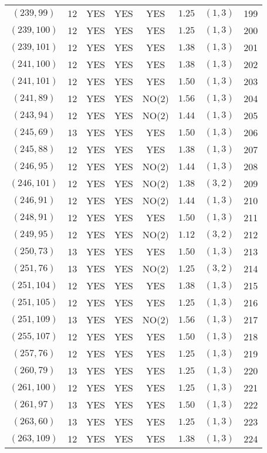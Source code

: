 \begin{longtable}{|c|c|c|c|c|c|c|c|}
$(239,99)$ & 12 & YES & YES & YES & $1.25$ & $(1,3)$ & 199\\
$(239,100)$ & 12 & YES & YES & YES & $1.25$ & $(1,3)$ & 200\\
$(239,101)$ & 12 & YES & YES & YES & $1.38$ & $(1,3)$ & 201\\
$(241,100)$ & 12 & YES & YES & YES & $1.38$ & $(1,3)$ & 202\\
$(241,101)$ & 12 & YES & YES & YES & $1.50$ & $(1,3)$ & 203\\
$(241,89)$ & 12 & YES & YES & NO(2) & $1.56$ & $(1,3)$ & 204\\
$(243,94)$ & 12 & YES & YES & NO(2) & $1.44$ & $(1,3)$ & 205\\
$(245,69)$ & 13 & YES & YES & YES & $1.50$ & $(1,3)$ & 206\\
$(245,88)$ & 12 & YES & YES & YES & $1.38$ & $(1,3)$ & 207\\
$(246,95)$ & 12 & YES & YES & NO(2) & $1.44$ & $(1,3)$ & 208\\
$(246,101)$ & 12 & YES & YES & NO(2) & $1.38$ & $(3,2)$ & 209\\
$(246,91)$ & 12 & YES & YES & NO(2) & $1.44$ & $(1,3)$ & 210\\
$(248,91)$ & 12 & YES & YES & YES & $1.50$ & $(1,3)$ & 211\\
$(249,95)$ & 12 & YES & YES & NO(2) & $1.12$ & $(3,2)$ & 212\\
$(250,73)$ & 13 & YES & YES & YES & $1.50$ & $(1,3)$ & 213\\
$(251,76)$ & 13 & YES & YES & NO(2) & $1.25$ & $(3,2)$ & 214\\
$(251,104)$ & 12 & YES & YES & YES & $1.38$ & $(1,3)$ & 215\\
$(251,105)$ & 12 & YES & YES & YES & $1.25$ & $(1,3)$ & 216\\
$(251,109)$ & 13 & YES & YES & NO(2) & $1.56$ & $(1,3)$ & 217\\
$(255,107)$ & 12 & YES & YES & YES & $1.50$ & $(1,3)$ & 218\\
$(257,76)$ & 12 & YES & YES & YES & $1.25$ & $(1,3)$ & 219\\
$(260,79)$ & 13 & YES & YES & YES & $1.25$ & $(1,3)$ & 220\\
$(261,100)$ & 12 & YES & YES & YES & $1.25$ & $(1,3)$ & 221\\
$(261,97)$ & 13 & YES & YES & YES & $1.50$ & $(1,3)$ & 222\\
$(263,60)$ & 13 & YES & YES & YES & $1.25$ & $(1,3)$ & 223\\
$(263,109)$ & 12 & YES & YES & YES & $1.38$ & $(1,3)$ & 224\\

\end{longtable}
